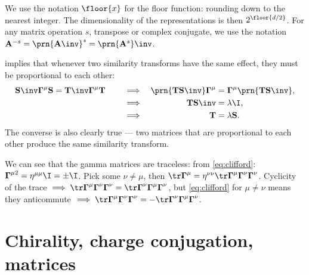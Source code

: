 \documentclass[11pt]{article}
\newcommand{\Gammab}{\boldsymbol{\Gamma}}
\renewcommand{\S}{\mathbf{S}}
\newcommand{\T}{\mathbf{T}}
\newcommand{\A}{\mathbf{A}}
\begin{document}
We use the notation $\floor{x}$ for the floor function: rounding down to the nearest integer.
The dimensionality of the representations is then $2^{\floor{d/2}}$.
For any matrix operation \(s\), \eg transpose or complex conjugate, we use the notation \( \A^{-s} = \prn{\A\inv}^s = \prn{\A^s}\inv \).

 implies that whenever two similarity transforms have the same effect, they must be proportional to each other:
%
\begin{equation}\label{eq:simsim}
  \S\inv \Gammab^\mu \S = \T\inv \Gammab^\mu \T
  \qquad
  \begin{aligned}[t]
     &\implies &
     \prn{\T \S\inv} \Gammab^\mu &= \Gammab^\mu \prn{\T \S\inv}, \\
     &\implies &
     \T \S\inv &= \lambda \I, \\
     &\implies &
     \T &= \lambda \S.
  \end{aligned}
\end{equation}
%
The converse is also clearly true --- two matrices that are proportional to each other produce the same similarity transform.

We can see that the gamma matrices are traceless: from \cref{eq:clifford}: \( \Gammab^{\mu2} = \eta^{\mu\mu} \I = \pm \I \).
Pick some $\nu \neq \mu$, then \( \tr \Gammab^\mu = \eta^{\nu\nu} \tr \Gammab^\mu \Gammab^\nu \Gammab^\nu \).
Cyclicity of the trace \( \implies \tr \Gammab^\mu \Gammab^\nu \Gammab^\nu = \tr \Gammab^\nu \Gammab^\mu \Gammab^\nu \), but \cref{eq:clifford} for $\mu \neq \nu$ means they anticommute \( \implies \tr \Gammab^\mu \Gammab^\nu \Gammab^\nu = - \tr \Gammab^\nu \Gammab^\mu \Gammab^\nu \).


\section{Chirality, charge conjugation, \etc matrices}\label{sec:ccmats}
\end{document}
